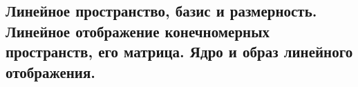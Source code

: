 \subsection{Линейное пространство, базис и размерность. Линейное отображение конечномерных пространств, его матрица. Ядро и образ линейного отображения.}
